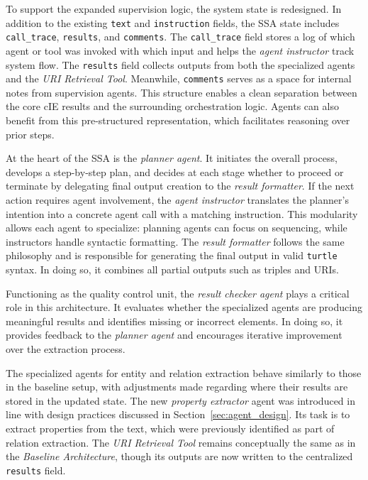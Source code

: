 \documentclass[a4paper,oneside,bibliography=totoc]{scrbook}
\begin{document}
To support the expanded supervision logic, the system state is redesigned. In addition to the existing \texttt{text} and \texttt{instruction} fields, the \ac{SSA} state includes \texttt{call\_trace}, \texttt{results}, and \texttt{comments}. The \texttt{call\_trace} field stores a log of which agent or tool was invoked with which input and helps the \textit{agent instructor} track system flow. The \texttt{results} field collects outputs from both the specialized agents and the \textit{URI Retrieval Tool}. Meanwhile, \texttt{comments} serves as a space for internal notes from supervision agents. This structure enables a clean separation between the core \ac{cIE} results and the surrounding orchestration logic. Agents can also benefit from this pre-structured representation, which facilitates reasoning over prior steps.

At the heart of the \ac{SSA} is the \textit{planner agent}. It initiates the overall process, develops a step-by-step plan, and decides at each stage whether to proceed or terminate by delegating final output creation to the \textit{result formatter}. If the next action requires agent involvement, the \textit{agent instructor} translates the planner's intention into a concrete agent call with a matching instruction. This modularity allows each agent to specialize: planning agents can focus on sequencing, while instructors handle syntactic formatting. The \textit{result formatter} follows the same philosophy and is responsible for generating the final output in valid \texttt{turtle} syntax. In doing so, it combines all partial outputs such as triples and \acp{URI}.

Functioning as the quality control unit, the \textit{result checker agent} plays a critical role in this architecture. It evaluates whether the specialized agents are producing meaningful results and identifies missing or incorrect elements. In doing so, it provides feedback to the \textit{planner agent} and encourages iterative improvement over the extraction process.

The specialized agents for entity and relation extraction behave similarly to those in the baseline setup, with adjustments made regarding where their results are stored in the updated state. The new \textit{property extractor} agent was introduced in line with design practices discussed in Section~\ref{sec:agent_design}. Its task is to extract properties from the text, which were previously identified as part of relation extraction. The \textit{URI Retrieval Tool} remains conceptually the same as in the \textit{Baseline Architecture}, though its outputs are now written to the centralized \texttt{results} field.
\end{document}
